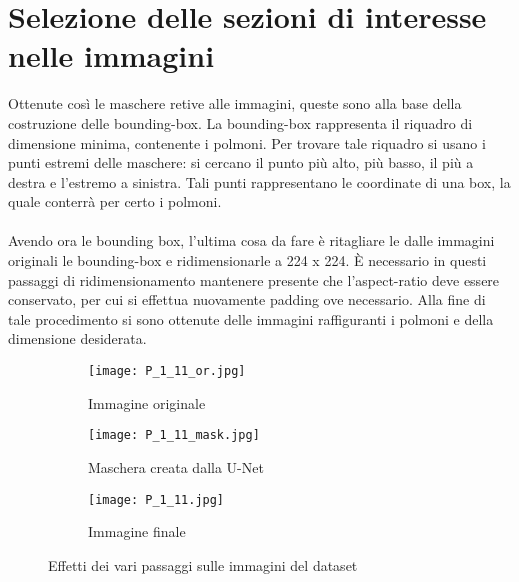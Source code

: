\section{Selezione delle sezioni di interesse nelle immagini}
Ottenute così le maschere retive alle immagini, queste sono alla base della costruzione delle bounding-box.
La bounding-box rappresenta il riquadro di dimensione minima, contenente i polmoni.
Per trovare tale riquadro si usano i punti estremi delle maschere: si cercano il punto più alto, più basso, il più a destra e l'estremo a sinistra.
Tali punti rappresentano le coordinate di una box, la quale conterrà per certo i polmoni.
\\\\
Avendo ora le bounding box, l'ultima cosa da fare è ritagliare le dalle immagini originali le bounding-box e ridimensionarle a 224 x 224.
È necessario in questi passaggi di ridimensionamento mantenere presente che l'aspect-ratio deve essere conservato, per cui si effettua nuovamente padding ove necessario.
Alla fine di tale procedimento si sono ottenute delle immagini raffiguranti i polmoni e della dimensione desiderata.
\begin{figure}[h]
    \centering
    \begin{subfigure}{.45\textwidth}
        \centering
        \texttt{[image: P\_1\_11\_or.jpg]}  
        \caption{Immagine originale}
    \end{subfigure}
    \begin{subfigure}{.45\textwidth}
        \centering
        \texttt{[image: P\_1\_11\_mask.jpg]}  
        \caption{Maschera creata dalla U-Net}
    \end{subfigure}
    \begin{subfigure}{.45\textwidth}
        \centering
        \texttt{[image: P\_1\_11.jpg]}  
        \caption{Immagine finale}
    \end{subfigure}
    \caption{Effetti dei vari passaggi sulle immagini del dataset}
    \label{Transformation}
\end{figure}

